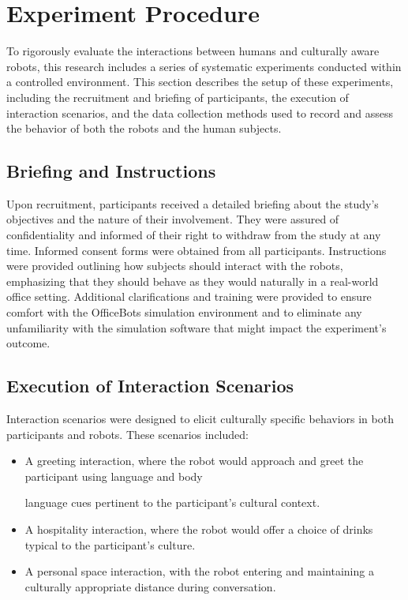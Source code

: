 \section{Experiment Procedure}

To rigorously evaluate the interactions between humans and culturally aware robots, this research includes a series of systematic experiments conducted within a controlled environment. This section describes the setup of these experiments, including the recruitment and briefing of participants, the execution of interaction scenarios, and the data collection methods used to record and assess the behavior of both the robots and the human subjects.

\subsection{Briefing and Instructions}

Upon recruitment, participants received a detailed briefing about the study's objectives and the nature of their involvement. They were assured of confidentiality and informed of their right to withdraw from the study at any time. Informed consent forms were obtained from all participants. Instructions were provided outlining how subjects should interact with the robots, emphasizing that they should behave as they would naturally in a real-world office setting. Additional clarifications and training were provided to ensure comfort with the OfficeBots simulation environment and to eliminate any unfamiliarity with the simulation software that might impact the experiment's outcome.

\subsection{Execution of Interaction Scenarios}

Interaction scenarios were designed to elicit culturally specific behaviors in both participants and robots. These scenarios included:

\begin{itemize}
    \item A greeting interaction, where the robot would approach and greet the participant using language and body

 language cues pertinent to the participant's cultural context.
    \item A hospitality interaction, where the robot would offer a choice of drinks typical to the participant's culture.
    \item A personal space interaction, with the robot entering and maintaining a culturally appropriate distance during conversation.
\end{itemize}

